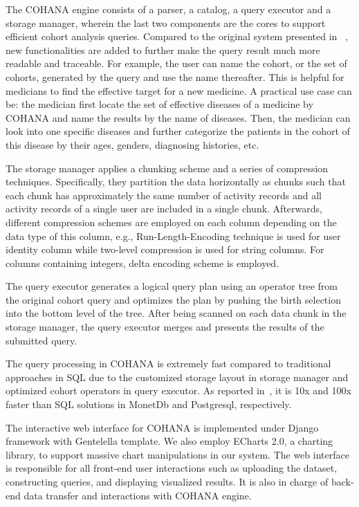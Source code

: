 \documentclass[10pt,conference,letterpaper]{IEEEtran}
\begin{document}
The COHANA engine consists of a parser, a catalog, a query executor and a storage manager, wherein the last two components are the cores to support efficient cohort analysis queries. 
Compared to the original system presented in ~\cite{jiang2016cohort}, new functionalities are added to further make the query result much more readable and traceable.
For example, the user can name the cohort, or the set of cohorts, generated by the query and use the name thereafter.
This is helpful for medicians to find the effective target for a new medicine. 
A practical use case can be: the medician first locate the set of effective diseases of a medicine by COHANA and name the results by the name of diseases. Then, the medician can look into one specific diseases and further categorize the patients in the cohort of this disease by their ages, genders, diagnosing histories, etc.

The storage manager applies a chunking scheme and a series of compression techniques. Specifically, they partition the data horizontally as chunks such that each chunk has approximately the same number of activity records and all activity records of a single user are included in a single chunk. Afterwards, different compression schemes are employed on each column depending on the data type of this column, e.g., Run-Length-Encoding technique is used for user identity column while two-level compression is used for string columns. For columns containing integers, delta encoding scheme is employed. 

The query executor generates a logical query plan using an operator tree from the original cohort query and optimizes the plan by pushing the birth selection into the bottom level of the tree. After being scanned on each data chunk in the storage manager, the query executor merges and presents the results of the submitted query.

The query processing in COHANA is extremely fast compared to traditional approaches in SQL due to the customized storage layout in storage manager and optimized cohort operators in query executor. As reported in~\cite{jiang2016cohort}, it is 10x and 100x faster than SQL solutions in MonetDb\cite{boncz2005monetdb} and Postgresql\cite{momjian2001postgresql}, respectively.

The interactive web interface for COHANA is implemented under Django\cite{django} framework with Gentelella\cite{gentelella} template. We also employ ECharts 2.0\cite{echarts}, a charting library, to support massive chart manipulations in our system. 
The web interface is responsible for all front-end user interactions such as uploading the dataset, constructing queries, and displaying visualized results. 
It is also in charge of back-end data transfer and interactions with COHANA engine. 
\end{document}
